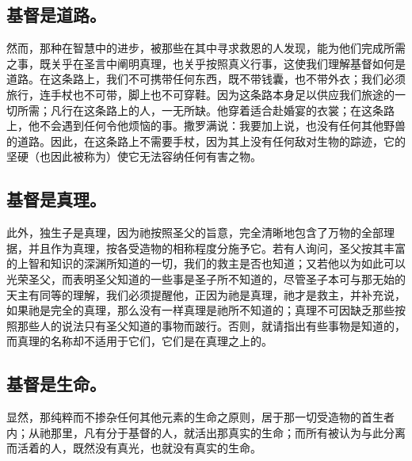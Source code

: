 \subsection{基督是道路。}

然而，那种在智慧中的进步，被那些在其中寻求救恩的人发现，能为他们完成所需之事，既关乎在圣言中阐明真理，也关乎按照真义行事，这使我们理解基督如何是道路。在这条路上，我们不可携带任何东西，既不带钱囊，也不带外衣；我们必须旅行，连手杖也不可带，脚上也不可穿鞋。因为这条路本身足以供应我们旅途的一切所需；凡行在这条路上的人，一无所缺。他穿着适合赴婚宴的衣裳；在这条路上，他不会遇到任何令他烦恼的事。撒罗满说：我要加上说，也没有任何其他野兽的道路。因此，在这条路上不需要手杖，因为其上没有任何敌对生物的踪迹，它的坚硬（也因此被称为）使它无法容纳任何有害之物。\par


\subsection{基督是真理。}

此外，独生子是真理，因为祂按照圣父的旨意，完全清晰地包含了万物的全部理据，并且作为真理，按各受造物的相称程度分施予它。若有人询问，圣父按其丰富的上智和知识的深渊所知道的一切，我们的救主是否也知道；又若他以为如此可以光荣圣父，而表明圣父知道的一些事是圣子所不知道的，尽管圣子本可与那无始的天主有同等的理解，我们必须提醒他，正因为祂是真理，祂才是救主，并补充说，如果祂是完全的真理，那么没有一样真理是祂所不知道的；真理不可因缺乏那些按照那些人的说法只有圣父知道的事物而跛行。否则，就请指出有些事物是知道的，而真理的名称却不适用于它们，它们是在真理之上的。\par


\subsection{基督是生命。}

显然，那纯粹而不掺杂任何其他元素的生命之原则，居于那一切受造物的首生者内；从祂那里，凡有分于基督的人，就活出那真实的生命；而所有被认为与此分离而活着的人，既然没有真光，也就没有真实的生命。\par


